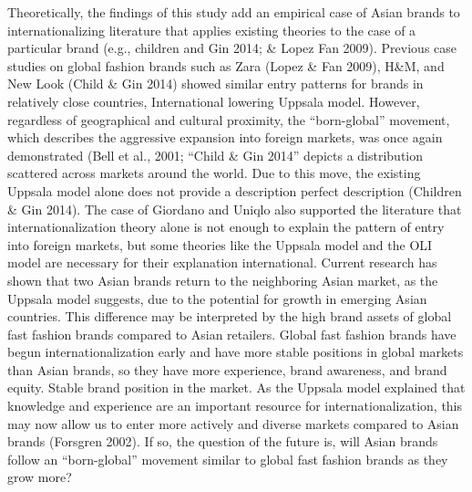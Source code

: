 \documentclass[12pt,a4paper]{article}
\begin{document}
Theoretically, the findings of this study add an empirical case of Asian
brands to internationalizing literature that applies existing theories
to the case of a particular brand (e.g., children and Gin 2014; \& Lopez
Fan 2009). Previous case studies on global fashion brands such as Zara
(Lopez \& Fan 2009), H\&M, and New Look (Child \& Gin 2014) showed
similar entry patterns for brands in relatively close countries,
International lowering Uppsala model. However, regardless of
geographical and cultural proximity, the ``born-global'' movement, which
describes the aggressive expansion into foreign markets, was once again
demonstrated (Bell et al., 2001; ``Child \& Gin 2014'' depicts a
distribution scattered across markets around the world. Due to this
move, the existing Uppsala model alone does not provide a description
perfect description (Children \& Gin 2014). The case of Giordano and
Uniqlo also supported the literature that internationalization theory
alone is not enough to explain the pattern of entry into foreign
markets, but some theories like the Uppsala model and the OLI model are
necessary for their explanation international. Current research has
shown that two Asian brands return to the neighboring Asian market, as
the Uppsala model suggests, due to the potential for growth in emerging
Asian countries. This difference may be interpreted by the high brand
assets of global fast fashion brands compared to Asian retailers. Global
fast fashion brands have begun internationalization early and have more
stable positions in global markets than Asian brands, so they have more
experience, brand awareness, and brand equity. Stable brand position in
the market. As the Uppsala model explained that knowledge and experience
are an important resource for internationalization, this may now allow
us to enter more actively and diverse markets compared to Asian brands
(Forsgren 2002). If so, the question of the future is, will Asian brands
follow an ``born-global'' movement similar to global fast fashion brands
as they grow more?
\end{document}
